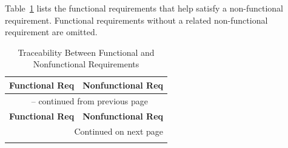 \documentclass[10pt]{article}
\begin{document}
Table~\ref{tab:FR2Rtm} lists the functional requirements that help satisfy a
non-functional requirement. Functional requirements without a related
non-functional requirement are omitted.

\begin{longtable}{p{} p{}}

\caption{Traceability Between Functional and Nonfunctional Requirements}
\label{tab:FR2Rtm}\\
\toprule
\textbf{Functional Req} & \textbf{Nonfunctional Req} \\
\midrule
\endfirsthead

\multicolumn{2}{c}{\tablename\ \thetable{} -- continued from previous page} \\
\toprule
\textbf{Functional Req} & \textbf{Nonfunctional Req} \\
\midrule
\endhead

\midrule
\multicolumn{2}{r}{Continued on next page} \\
\endfoot

\bottomrule
\endlastfoot


\end{longtable}
\end{document}
